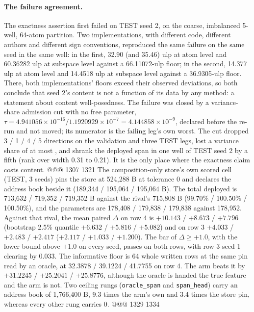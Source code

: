 \paragraph{The failure agreement.} The exactness assertion first failed on TEST seed 2, on the
coarse, imbalanced 5-well, 64-atom partition. Two implementations, with different code, different
authors and different sign conventions, reproduced the same failure on the same seed in the same
well: in the first, 32.90 (and 35.46) ulp at atom level and 60.36282 ulp at subspace level against
a 66.11072-ulp floor; in the second, 14.377 ulp at atom level and 14.4518 ulp at subspace level
against a 36.9305-ulp floor. There, both implementations' floors exceed their observed deviations,
so both conclude that seed 2's content is not a function of its data by any method: a statement
about content well-posedness. The failure was closed by a variance-share admission cut with no
free parameter, $\tau=4.941056\times10^{-16}/1.1920929\times10^{-7}=4.144858\times10^{-9}$,
declared before the re-run and not moved; its numerator is the failing leg's own worst.
The cut dropped 3 / 1 / 4 / 5 directions on the validation and three TEST legs, lost a variance
share of at most , and shrank the deployed span in one well of TEST seed 2 by a
fifth (rank over width 0.31 to 0.21). It is the only place where the exactness claim costs content.
@@@ 1307 1321
The composition-only store's own scored cell (TEST, 3 seeds) pins the store at 524,288 B at
tolerance 0 and declares the address book beside it (189,344 / 195,064 / 195,064 B). The total
deployed is 713,632 / 719,352 / 719,352 B against the rival's 715,808 B (99.70\% / 100.50\% /
100.50\%), and the parameters are 178,408 / 179,838 / 179,838 against 178,952. %
Against that rival, the mean paired $\Delta$ on row 4 is $+10.143$ / $+8.673$ / $+7.796$ (bootstrap
2.5\% quantile $+6.632$ / $+5.816$ / $+5.082$) and on row 3 $+4.033$ / $+2.483$ / $+2.417$
($+2.117$ / $+1.033$ / $+1.200$). The bar of $\Delta\ge+1.0$, with the lower bound above $+1.0$ on
every seed, passes on both rows, with row 3 seed 1 clearing by 0.033.
The informative floor is 64 whole written rows at the same pin read by an oracle, at 32.3878 /
39.1224 / 41.7755 on row 4. The arm beats it by $+31.2245$ / $+25.2041$ / $+25.8776$, although the
oracle is handed the true feature and the arm is not. %
Two ceiling rungs (\texttt{oracle\_span} and \texttt{span\_head}) carry an address book of 1,766,400
B, 9.3 times the arm's own and 3.4 times the store pin, whereas every other rung carries 0.
@@@ 1329 1334
